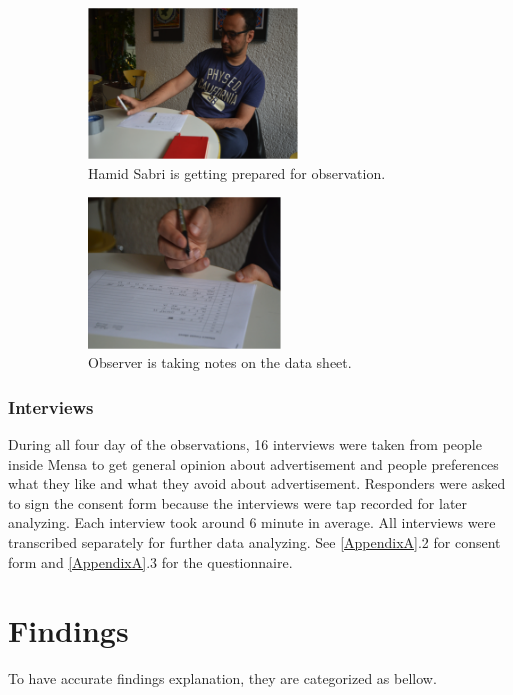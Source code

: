 \begin{figure}[H]
    \centering
    \begin{subfigure}[H]{0.45\textwidth}
        \centering
        \includegraphics[width=\textwidth,height=4cm]{Figures/3/hamid}
        \caption{Hamid Sabri is getting prepared for observation.}
        \label{fig:hamid}
    \end{subfigure}
    \hfill
    \begin{subfigure}[H]{0.45\textwidth}
        \centering
        \includegraphics[width=\textwidth,height=4cm]{Figures/3/observer}
        \caption{Observer is taking notes on the data sheet.}
        \label{fig:Observer}
    \end{subfigure}
    \caption{}
    \label{fig:observation_env}
\end{figure}


\subsubsection{Interviews}

During all four day of the observations, 16 interviews were taken from people inside Mensa to get general opinion about advertisement and people preferences what they like and what they avoid about advertisement. Responders were asked to sign the consent form because the interviews were tap recorded for later analyzing.  Each interview took around 6 minute in average. All interviews were transcribed separately for further data analyzing.
See \ref{AppendixA}.2 for consent form and  \ref{AppendixA}.3 for the questionnaire.

\section{Findings}
To have accurate findings explanation, they are categorized as bellow.


